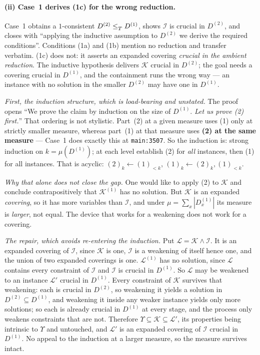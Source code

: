 \paragraph{(ii) Case~1 derives (1c) for the wrong reduction.}
Case~1 obtains a $1$-consistent $D^{(2)}\le_{T}^{}D^{(1)}$, shows $\mathcal I$
is crucial in $D^{(2)}$, and closes with ``applying the inductive assumption to
$D^{(2)}$ we derive the required conditions''. Conditions (1a) and (1b) mention
no reduction and transfer verbatim. (1c) does not: it asserts an expanded
covering \emph{crucial in the ambient reduction}. The inductive hypothesis
delivers $\mathcal K$ crucial in $D^{(2)}$; the goal needs a covering crucial
in $D^{(1)}$, and the containment runs the wrong way --- an instance with no
solution in the smaller $D^{(2)}$ may have one in $D^{(1)}$.

\emph{First, the induction structure, which is load-bearing and unstated.} The
proof opens ``We prove the claim by induction on the size of $D^{(1)}$.
\emph{Let us prove (2) first.}'' That ordering is not stylistic. Part~(2) at a
given measure uses (1) only at strictly smaller measure, whereas part~(1) at
that measure uses \textbf{(2) at the same measure} --- Case~1 does exactly this
at \texttt{main:3507}. So the induction is: strong induction on
$k=\mu(D^{(1)})$; at each level establish (2) for \emph{all} instances, then
(1) for all instances. That is acyclic: $(2)_{k}\leftarrow(1)_{<k}$,
$(1)_{k}\leftarrow(2)_{k},(1)_{<k}$.

\emph{Why that alone does not close the gap.} One would like to apply (2) to
$\mathcal K$ and conclude contrapositively that $\mathcal K^{(1)}$ has no
solution. But $\mathcal K$ is an expanded \emph{covering}, so it has more
variables than $\mathcal I$, and under $\mu=\sum_{x}|D^{(1)}_{x}|$ its measure
is \emph{larger}, not equal. The device that works for a weakening does not
work for a covering.

\emph{The repair, which avoids re-entering the induction.} Put
$\mathcal L=\mathcal K\wedge\mathcal I$. It is an expanded covering of
$\mathcal I$, since $\mathcal K$ is one, $\mathcal I$ is a weakening of itself
hence one, and the union of two expanded coverings is one. $\mathcal L^{(1)}$
has no solution, since $\mathcal L$ contains every constraint of $\mathcal I$
and $\mathcal I$ is crucial in $D^{(1)}$. So $\mathcal L$ may be weakened to an
instance $\mathcal L'$ crucial in $D^{(1)}$. Every constraint of $\mathcal K$
survives that weakening: each is crucial in $D^{(2)}$, so weakening it yields a
solution in $D^{(2)}\subseteq D^{(1)}$, and weakening it inside any weaker
instance yields only more solutions; so each is already crucial in $D^{(1)}$ at
every stage, and the process only weakens constraints that are not. Therefore
$\Upsilon\subseteq\mathcal K\subseteq\mathcal L'$, its properties being
intrinsic to $\Upsilon$ and untouched, and $\mathcal L'$ is an expanded
covering of $\mathcal I$ crucial in $D^{(1)}$. No appeal to the induction at a
larger measure, so the measure survives intact.

